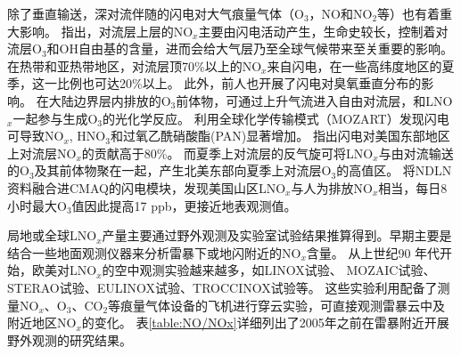 除了垂直输送，深对流伴随的闪电对大气痕量气体（O$_3$，NO和NO$_2$等）也有着重大影响\citep{DeCaria.2005,Schumann.2007,Ott.2010,Banerjee.2014}。
\citet{Levy.1996}指出，对流层上层的NO$_x$主要由闪电活动产生，生命史较长，控制着对流层O$_3$和OH自由基的含量，进而会给大气层乃至全球气候带来至关重要的影响。在热带和亚热带地区，对流层顶70\%以上的NO$_x$来自闪电，在一些高纬度地区的夏季，这一比例也可达20\%以上\citep{Jourdain.2001,Martin.2002}。
此外，前人也开展了闪电对臭氧垂直分布的影响。
在大陆边界层内排放的O$_3$前体物，可通过上升气流进入自由对流层，和LNO$_x$一起参与生成O$_3$的光化学反应\citep{Bond.2002}。
\citet{Tie.2001}利用全球化学传输模式（MOZART）发现闪电可导致NO$_x$, HNO$_3$和过氧乙酰硝酸酯(PAN)显著增加。
\citet{Cooper.2009}指出闪电对美国东部地区上对流层NO$_x$的贡献高于80\%。
而夏季上对流层的反气旋可将LNO$_x$与由对流输送的O$_3$及其前体物聚在一起，产生北美东部向夏季上对流层O$_3$的高值区。
\citet{Kang.2020}将NDLN资料融合进CMAQ的闪电模块，发现美国山区LNO$_x$与人为排放NO$_x$相当，每日8小时最大O$_3$值因此提高17 ppb，更接近地表观测值。

局地或全球LNO$_x$产量主要通过野外观测及实验室试验结果推算得到。早期主要是结合一些地面观测仪器来分析雷暴下或地闪附近的NO$_x$含量。
从上世纪90 年代开始，欧美对LNO$_x$的空中观测实验越来越多，如LINOX试验\citep{Huntrieser.1998}、 MOZAIC试验\citep{Marenco.1998}、
STERAO试验\citep{Dye.2000}、EULINOX试验\citep{Holler.2000}、TROCCINOX试验\citep{Huntrieser.2007}等。
这些实验利用配备了测量NO$_x$、O$_3$、CO$_2$等痕量气体设备的飞机进行穿云实验，可直接观测雷暴云中及附近地区NO$_x$的变化。
表\ref{table:NO/NOx}详细列出了2005年之前在雷暴附近开展野外观测的研究结果。

